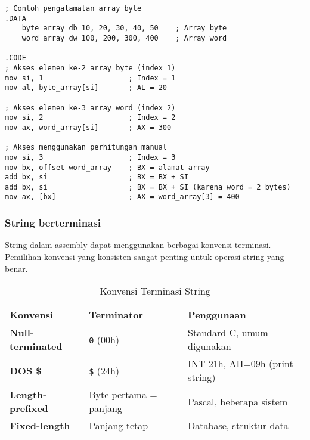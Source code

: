 \documentclass[../main.tex]{subfiles}
\begin{document}
            \begin{lstlisting}[language={[x86masm]Assembler}, caption=Contoh Pengalamatan Array, label={lst:array-addressing}]
; Contoh pengalamatan array byte
.DATA
    byte_array db 10, 20, 30, 40, 50    ; Array byte
    word_array dw 100, 200, 300, 400    ; Array word

.CODE
; Akses elemen ke-2 array byte (index 1)
mov si, 1                    ; Index = 1
mov al, byte_array[si]       ; AL = 20

; Akses elemen ke-3 array word (index 2)
mov si, 2                    ; Index = 2
mov ax, word_array[si]       ; AX = 300

; Akses menggunakan perhitungan manual
mov si, 3                    ; Index = 3
mov bx, offset word_array    ; BX = alamat array
add bx, si                   ; BX = BX + SI
add bx, si                   ; BX = BX + SI (karena word = 2 bytes)
mov ax, [bx]                 ; AX = word_array[3] = 400
            \end{lstlisting}

        \subsubsection{String berterminasi}
            String dalam assembly dapat menggunakan berbagai konvensi terminasi. Pemilihan konvensi yang konsisten sangat penting untuk operasi string yang benar.

            \begin{table}[H]
                \centering
                \caption{Konvensi Terminasi String}
                \begin{tabular}{|p{3cm}|p{4cm}|p{6cm}|}
                    \hline
                    \textbf{Konvensi} & \textbf{Terminator} & \textbf{Penggunaan} \\
                    \hline
                    \textbf{Null-terminated} & \texttt{0} (00h) & Standard C, umum digunakan \\
                    \hline
                    \textbf{DOS \$} & \texttt{\$} (24h) & INT 21h, AH=09h (print string) \\
                    \hline
                    \textbf{Length-prefixed} & Byte pertama = panjang & Pascal, beberapa sistem \\
                    \hline
                    \textbf{Fixed-length} & Panjang tetap & Database, struktur data \\
                    \hline
                \end{tabular}
                \label{tab:string-termination}
            \end{table}
\end{document}
